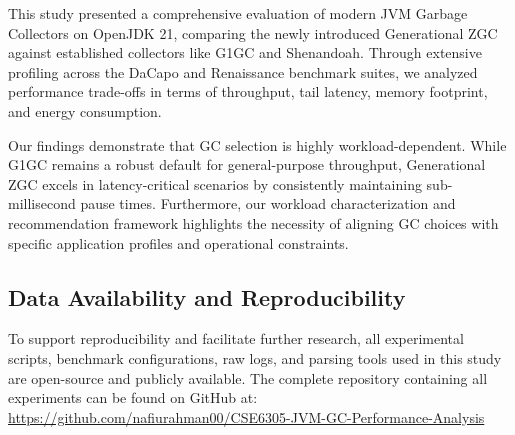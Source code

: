 This study presented a comprehensive evaluation of modern JVM Garbage Collectors on OpenJDK 21, comparing the newly introduced Generational ZGC against established collectors like G1GC and Shenandoah. Through extensive profiling across the DaCapo and Renaissance benchmark suites, we analyzed performance trade-offs in terms of throughput, tail latency, memory footprint, and energy consumption.

Our findings demonstrate that GC selection is highly workload-dependent. While G1GC remains a robust default for general-purpose throughput, Generational ZGC excels in latency-critical scenarios by consistently maintaining sub-millisecond pause times. Furthermore, our workload characterization and recommendation framework highlights the necessity of aligning GC choices with specific application profiles and operational constraints.

\subsection*{Data Availability and Reproducibility}

To support reproducibility and facilitate further research, all experimental scripts, benchmark configurations, raw logs, and parsing tools used in this study are open-source and publicly available. The complete repository containing all experiments can be found on GitHub at: \\
\url{https://github.com/nafiurahman00/CSE6305-JVM-GC-Performance-Analysis}
